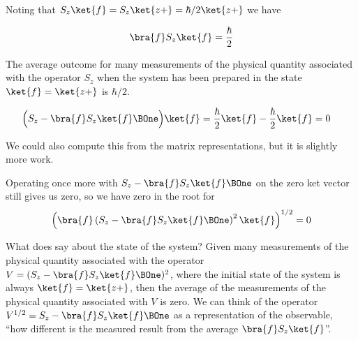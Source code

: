 Noting that $S_z \ket{f} = S_z \ket{z+} = \hbar/2 \ket{z+}$ we have

\begin{align}\label{eqn:qmIproblemSet3:10}
\bra{f} S_z \ket{f} = \frac{\hbar}{2} 
\end{align}

The average outcome for many measurements of the physical quantity associated with the operator $S_z$ when the system has been prepared in the state $\ket{f} = \ket{z+}$ is $\hbar/2$.

\begin{align}\label{eqn:qmIproblemSet3:11}
\Bigl(S_z - \bra{f} S_z \ket{f} \BOne \Bigr) \ket{f}
&= 
\frac{\hbar}{2} \ket{f} 
-\frac{\hbar}{2} \ket{f} = 0
\end{align}

We could also compute this from the matrix representations, but it is slightly more work.

Operating once more with $S_z - \bra{f} S_z \ket{f} \BOne$ on the zero ket vector still gives us zero, so we have zero in the root for 
\begin{align}\label{eqn:qmIproblemSet3:3b}
\left(\bra{f} \left( S_z - \bra{f} S_z \ket{f} \BOne \right)^2 \ket{f} \right)^{1/2} = 0
\end{align}




What does  say about the state of the system?  Given many measurements of the physical quantity associated with the operator $V = (S_z - \bra{f} S_z \ket{f} \BOne)^2$, where the initial state of the system is always $\ket{f} = \ket{z+}$, then the average of the measurements of the physical quantity associated with $V$ is zero.  We can think of the operator $V^{1/2} = S_z - \bra{f} S_z \ket{f} \BOne$ as a representation of the observable, ``how different is the measured result from the average $\bra{f} S_z \ket{f}$''.  

